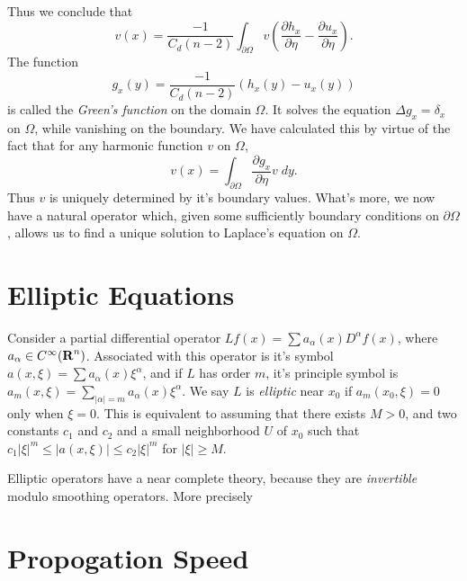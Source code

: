 %
Thus we conclude that
%
\[ v(x) = \frac{-1}{C_d (n-2)} \int_{\partial \Omega} v \left( \frac{\partial h_x}{\partial \eta} - \frac{\partial u_x}{\partial \eta} \right). \]
%
The function
%
\[ g_x(y) = \frac{-1}{C_d (n-2)} (h_x(y) - u_x(y)) \]
%
is called the \emph{Green's function} on the domain $\Omega$. It solves the equation $\Delta g_x = \delta_x$ on $\Omega$, while vanishing on the boundary. We have calculated this by virtue of the fact that for any harmonic function $v$ on $\Omega$,
%
\[ v(x) = \int_{\partial \Omega} \frac{\partial g_x}{\partial \eta} v\; dy. \]
%
Thus $v$ is uniquely determined by it's boundary values. What's more, we now have a natural operator which, given some sufficiently boundary conditions on $\partial \Omega$, allows us to find a unique solution to Laplace's equation on $\Omega$.




\chapter{Elliptic Equations}

Consider a partial differential operator $L f(x) = \sum a_\alpha(x) D^\alpha f(x)$, where $a_\alpha \in C^\infty(\operatorname{\mathbf{R}}^n)$. Associated with this operator is it's symbol $a(x,\xi) = \sum a_\alpha(x) \xi^\alpha$, and if $L$ has order $m$, it's principle symbol is $a_m(x,\xi) = \sum_{|\alpha| = m} a_\alpha(x) \xi^\alpha$. We say $L$ is \emph{elliptic} near $x_0$ if $a_m(x_0,\xi) = 0$ only when $\xi = 0$. This is equivalent to assuming that there exists $M > 0$, and two constants $c_1$ and $c_2$ and a small neighborhood $U$ of $x_0$ such that $c_1 |\xi|^m \leq |a(x,\xi)| \leq c_2 |\xi|^m$ for $|\xi| \geq M$.

Elliptic operators have a near complete theory, because they are \emph{invertible} modulo smoothing operators. More precisely

















\chapter{Propogation Speed}

